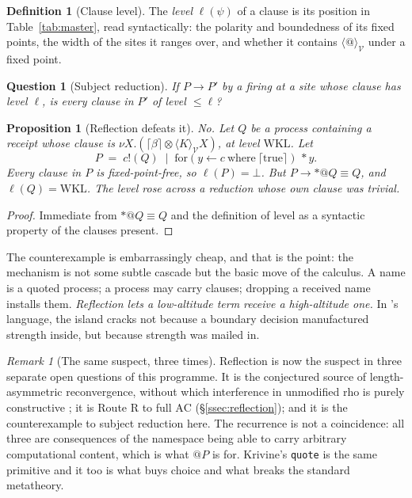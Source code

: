\documentclass[11pt]{article}
\theoremstyle{definition}
\newtheorem{definition}{Definition}
\theoremstyle{plain}
\newtheorem{proposition}{Proposition}
\newtheorem{question}{Question}
\theoremstyle{remark}
\newtheorem{remark}{Remark}
\newcommand{\V}{\mathcal{V}}
\newcommand{\tensorv}{\otimes}
\newcommand{\scong}{\equiv}
\newcommand{\crisp}[1]{\lceil #1 \rceil}
\newcommand{\AC}{\mathrm{AC}}
\newcommand{\WKL}{\mathrm{WKL}}
\begin{document}
\begin{definition}[Clause level]\label{def:level}
The \emph{level} $\ell(\psi)$ of a clause is its position in Table~\ref{tab:master},
read syntactically: the polarity and boundedness of its fixed points, the width of the
sites it ranges over, and whether it contains $\langle @ \rangle_\V$ under a fixed
point.
\end{definition}

\begin{question}[Subject reduction]\label{q:sr}
If $P \to P'$ by a firing at a site whose clause has level $\ell$, is every clause in
$P'$ of level $\leq \ell$?
\end{question}

\begin{proposition}[Reflection defeats it]\label{prop:srfails}
No. Let $Q$ be a process containing a receipt whose clause is
$\nu X.(\crisp{\beta} \tensorv \langle K \rangle_\V X)$, at level $\WKL$. Let
\[
  P \;=\; c!(Q) \;\mid\; \mathrm{for}(y \leftarrow c \ \mathrm{where}\
  \crisp{\mathrm{true}})\, {*}y .
\]
Every clause \emph{in $P$} is fixed-point-free, so $\ell(P) = \bot$. But
$P \to {*}@Q \scong Q$, and $\ell(Q) = \WKL$. The level rose across a reduction whose
own clause was trivial.
\end{proposition}

\begin{proof}
Immediate from $*@Q \scong Q$ and the definition of level as a syntactic property of
the clauses present.
\end{proof}

The counterexample is embarrassingly cheap, and that is the point: the mechanism is not
some subtle cascade but the basic move of the calculus. A name is a quoted process; a
process may carry clauses; dropping a received name installs them. \emph{Reflection
lets a low-altitude term receive a high-altitude one.} In \cite{agency}'s language, the
island cracks not because a boundary decision manufactured strength inside, but because
strength was mailed in.

\begin{remark}[The same suspect, three times]
Reflection is now the suspect in three separate open questions of this programme. It
is the conjectured source of length-asymmetric reconvergence, without which
interference in unmodified rho is purely constructive \cite{gradedwhere}; it is
Route R to full $\AC$ (\S\ref{ssec:reflection}); and it is the counterexample to
subject reduction here. The recurrence is not a coincidence: all three are consequences
of the namespace being able to carry arbitrary computational content, which is what
$@P$ is for. Krivine's \texttt{quote} is the same primitive and it too is what buys
choice and what breaks the standard metatheory.
\end{remark}
\end{document}
